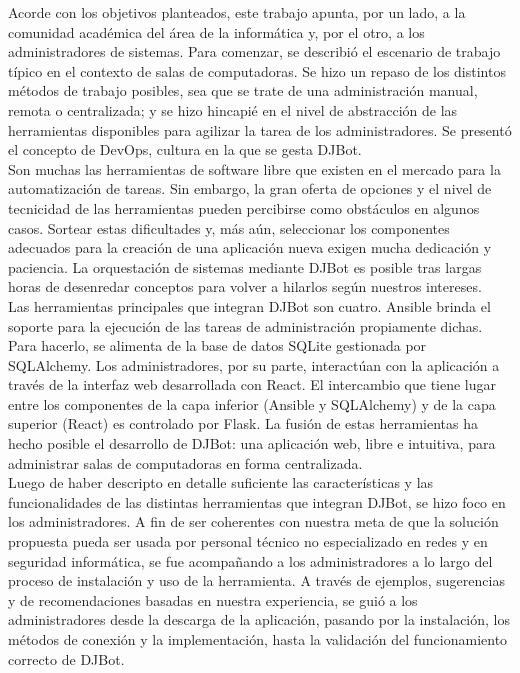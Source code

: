 \documentclass[a4paper,12pt]{article}
\begin{document}
Acorde con los objetivos planteados, este trabajo apunta, por un lado, a la comunidad académica del área de la informática y, por el otro, a los administradores de sistemas. Para comenzar, se describió el escenario de trabajo típico en el contexto de salas de computadoras. Se hizo un repaso de los distintos métodos de trabajo posibles, sea que se trate de una administración manual, remota o centralizada; y se hizo hincapié en el nivel de abstracción de las herramientas disponibles para agilizar la tarea de los administradores. Se presentó el concepto de DevOps, cultura en la que se gesta DJBot.\\

Son muchas las herramientas de software libre que existen en el mercado para la automatización de tareas. Sin embargo, la gran oferta de opciones y el nivel de tecnicidad de las herramientas pueden percibirse como obstáculos en algunos casos. Sortear estas dificultades y, más aún, seleccionar los componentes adecuados para la creación de una aplicación nueva exigen mucha dedicación y paciencia. La orquestación de sistemas mediante DJBot es posible tras largas horas de desenredar conceptos para volver a hilarlos según nuestros intereses.\\

Las herramientas principales que integran DJBot son cuatro. Ansible brinda el soporte para la ejecución de las tareas de administración propiamente dichas. Para hacerlo, se alimenta de la base de datos SQLite gestionada por SQLAlchemy. Los administradores, por su parte, interactúan con la aplicación a través de la interfaz web desarrollada con React. El intercambio que tiene lugar entre los componentes de la capa inferior (Ansible y SQLAlchemy) y de la capa superior (React) es controlado por Flask. La fusión de estas herramientas ha hecho posible el desarrollo de DJBot: una aplicación web, libre e intuitiva, para administrar salas de computadoras en forma centralizada.\\

Luego de haber descripto en detalle suficiente las características y las 
funcionalidades de las distintas herramientas que integran DJBot, se hizo foco en los administradores. A fin de ser coherentes con nuestra meta de que la solución propuesta pueda ser usada por personal técnico no especializado en redes y en seguridad informática, se fue acompañando a los administradores a lo largo del proceso de instalación y uso de la herramienta. A través de ejemplos, sugerencias y de recomendaciones basadas en nuestra experiencia, se guió a los administradores desde la descarga de la aplicación, pasando por la instalación, los métodos de conexión y la implementación, hasta la validación del funcionamiento correcto de DJBot.\\
\end{document}
